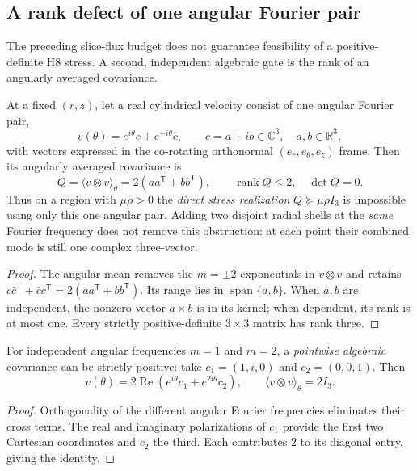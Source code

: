 
\subsection{A rank defect of one angular Fourier pair}
\label{subsec:angular-rank-defect-XXIV}
The preceding slice-flux budget does not guarantee feasibility of
a positive-definite H8 stress. A second, independent algebraic
gate is the rank of an angularly averaged covariance.

\begin{proposition}
\label{prop:single-pair-rank-XXIV}
At a fixed $(r,z)$, let a real cylindrical velocity consist
of one angular Fourier pair,
\[
v(\theta)=e^{i\theta}c+e^{-i\theta}\overline c,
\qquad c=a+ib\in\mathbb C^3,\quad a,b\in\mathbb R^3,
\]
with vectors expressed in the co-rotating orthonormal
$(e_r,e_\theta,e_z)$ frame. Then its angularly averaged covariance
is
\[
\boxed{Q=\langle v\otimes v\rangle_\theta
=2(aa^{\mathsf T}+bb^{\mathsf T}),\qquad
\operatorname{rank}Q\le2,\quad\det Q=0.}
\]
Thus on a region with $\mu\rho>0$ the \emph{direct stress
realization} $Q\succeq\mu\rho I_3$ is impossible using only
this one angular pair. Adding two disjoint radial shells at the
\emph{same} Fourier frequency does not remove this obstruction:
at each point their combined mode is still one complex
three-vector.
\end{proposition}
\begin{proof}
The angular mean removes the $m=\pm2$ exponentials in
$v\otimes v$ and retains $c\bar c^{\mathsf T}
+\bar c c^{\mathsf T}=2(aa^{\mathsf T}+bb^{\mathsf T})$.
Its range lies in $\operatorname{span}\{a,b\}$.
When $a,b$ are independent, the nonzero vector $a\times b$
is in its kernel; when dependent, its rank is at most one.
Every strictly positive-definite $3\times3$ matrix has rank three.
\end{proof}

\begin{proposition}
\label{prop:two-frequency-PSD-XXIV}
For independent angular frequencies $m=1$ and $m=2$, a
\emph{pointwise algebraic} covariance can be strictly positive:
take $c_1=(1,i,0)$ and $c_2=(0,0,1)$. Then
\[
v(\theta)=2\operatorname{Re}(e^{i\theta}c_1+
e^{2i\theta}c_2),\qquad
\boxed{\langle v\otimes v\rangle_\theta=2I_3.}
\]
\end{proposition}
\begin{proof}
Orthogonality of the different angular Fourier frequencies
eliminates their cross terms. The real and imaginary
polarizations of $c_1$ provide the first two Cartesian
coordinates and $c_2$ the third. Each contributes $2$ to its
diagonal entry, giving the identity.
\end{proof}

